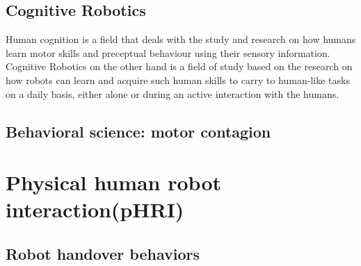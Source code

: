 \documentclass[a4paper, 12pt, oneside]{Thesis}  %
\begin{document}
%
%
%	
%	

\subsection{Cognitive Robotics}
Human cognition is a field that deals with the study and research on how humans learn motor skills and preceptual behaviour using their sensory information. Cognitive Robotics on the other hand is a field of study based on the research on how robots can learn and acquire such human skills to carry to human-like tasks on a daily basis, either alone or during an active interaction with the humans.

%


\subsection{Behavioral science: motor contagion}


\clearpage
\section{Physical human robot interaction(pHRI)}

\subsection{Robot handover behaviors}
%
\end{document}
